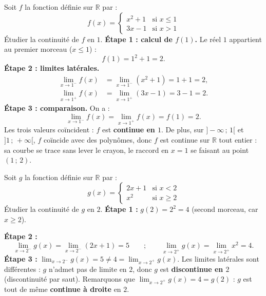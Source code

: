 \documentclass[11pt]{article}
\begin{document}
\begin{exoresolu}
Soit $f$ la fonction définie sur $\mathbb{R}$ par :
\[ f(x) = \begin{cases} x^2 + 1 & \text{si } x \leq 1 \\ 3x - 1 & \text{si } x > 1 \end{cases} \]
Étudier la continuité de $f$ en $1$.
\tcblower
\textbf{Étape 1 : calcul de $f(1)$.} Le réel $1$ appartient au premier morceau ($x \leq 1$) :
\[ f(1) = 1^2 + 1 = 2. \]
\textbf{Étape 2 : limites latérales.}
\begin{align*}
\lim_{x \to 1^-} f(x) &= \lim_{x \to 1^-} (x^2 + 1) = 1 + 1 = 2, \\
\lim_{x \to 1^+} f(x) &= \lim_{x \to 1^+} (3x - 1) = 3 - 1 = 2.
\end{align*}
\textbf{Étape 3 : comparaison.} On a :
\[ \lim_{x \to 1^-} f(x) = \lim_{x \to 1^+} f(x) = f(1) = 2. \]
Les trois valeurs coïncident : $f$ est \textbf{continue en $1$}. De plus, sur $]-\infty\,;\,1[$ et $]1\,;\,+\infty[$, $f$ coïncide avec des polynômes, donc $f$ est continue sur $\mathbb{R}$ tout entier : sa courbe se trace sans lever le crayon, le raccord en $x = 1$ se faisant au point $(1\,;\,2)$.
\end{exoresolu}

\begin{exoresolu}
Soit $g$ la fonction définie sur $\mathbb{R}$ par :
\[ g(x) = \begin{cases} 2x + 1 & \text{si } x < 2 \\ x^2 & \text{si } x \geq 2 \end{cases} \]
Étudier la continuité de $g$ en $2$.
\tcblower
\textbf{Étape 1 :} $g(2) = 2^2 = 4$ (second morceau, car $x \geq 2$).

\textbf{Étape 2 :}
\[ \lim_{x \to 2^-} g(x) = \lim_{x \to 2^-} (2x+1) = 5 \qquad ; \qquad \lim_{x \to 2^+} g(x) = \lim_{x \to 2^+} x^2 = 4. \]
\textbf{Étape 3 :} $\displaystyle\lim_{x\to 2^-} g(x) = 5 \neq 4 = \lim_{x\to 2^+} g(x)$. Les limites latérales sont différentes : $g$ n'admet pas de limite en $2$, donc $g$ est \textbf{discontinue en $2$} (discontinuité par saut). Remarquons que $\displaystyle\lim_{x\to 2^+} g(x) = 4 = g(2)$ : $g$ est tout de même \textbf{continue à droite} en $2$.
\end{exoresolu}
\end{document}
